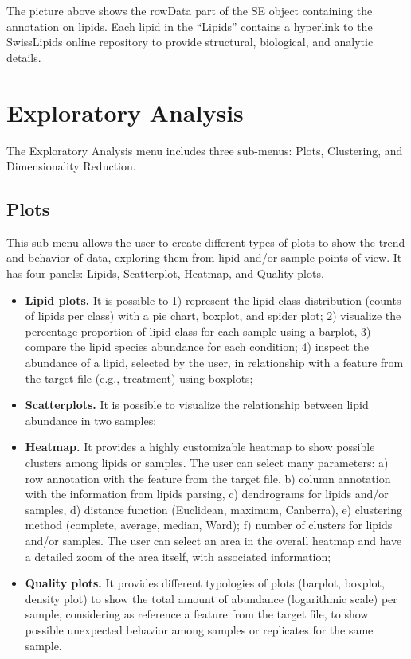\documentclass[
]{book}
\providecommand{\tightlist}{%
  \setlength{\itemsep}{0pt}\setlength{\parskip}{0pt}}
\begin{document}
The picture above shows the rowData part of the SE object containing the annotation on lipids. Each lipid in the ``Lipids'' contains a hyperlink to the SwissLipids online repository to provide structural, biological, and analytic details.

\hypertarget{sec34}{%
\section{Exploratory Analysis}\label{sec34}}

The Exploratory Analysis menu includes three sub-menus: Plots, Clustering, and Dimensionality Reduction.

\hypertarget{sec341}{%
\subsection{Plots}\label{sec341}}

This sub-menu allows the user to create different types of plots to show the trend and behavior of data, exploring them from lipid and/or sample points of view. It has four panels: Lipids, Scatterplot, Heatmap, and Quality plots.

\begin{itemize}
\tightlist
\item
  \textbf{Lipid plots.} It is possible to 1) represent the lipid class distribution (counts of lipids per class) with a pie chart, boxplot, and spider plot; 2) visualize the percentage proportion of lipid class for each sample using a barplot, 3) compare the lipid species abundance for each condition; 4) inspect the abundance of a lipid, selected by the user, in relationship with a feature from the target file (e.g., treatment) using boxplots;
\item
  \textbf{Scatterplots.} It is possible to visualize the relationship between lipid abundance in two samples;
\item
  \textbf{Heatmap.} It provides a highly customizable heatmap to show possible clusters among lipids or samples. The user can select many parameters: a) row annotation with the feature from the target file, b) column annotation with the information from lipids parsing, c) dendrograms for lipids and/or samples, d) distance function (Euclidean, maximum, Canberra), e) clustering method (complete, average, median, Ward); f) number of clusters for lipids and/or samples. The user can select an area in the overall heatmap and have a detailed zoom of the area itself, with associated information;
\item
  \textbf{Quality plots.} It provides different typologies of plots (barplot, boxplot, density plot) to show the total amount of abundance (logarithmic scale) per sample, considering as reference a feature from the target file, to show possible unexpected behavior among samples or replicates for the same sample.
\end{itemize}
\end{document}
